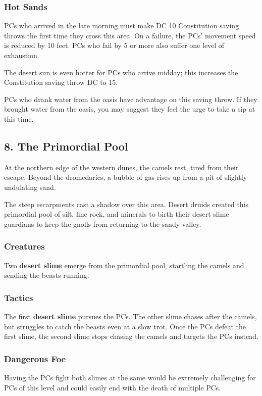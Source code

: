 \documentclass[10pt,a4paper,twoside,bg=print,twocolumn,openany,nodeprecatedcode]{dndbook}
\begin{document}
\subsubsection{Hot Sands}
PCs who arrived in the late morning must make DC 10 Constitution saving throws the first time they cross this area. On a failure, the PCs' movement speed is reduced by 10 feet. PCs who fail by 5 or more also suffer one level of exhaustion.

The desert sun is even hotter for PCs who arrive midday; this increases the Constitution saving throw DC to 15.

PCs who drank water from the oasis have advantage on this saving throw. If they brought water from the oasis, you may suggest they feel the urge to take a sip at this time.

\subsection{8. The Primordial Pool}
\begin{DndReadAloud}{}
At the northern edge of the western dunes, the camels rest, tired from their escape. Beyond the dromedaries, a bubble of gas rises up from a pit of slightly undulating sand.

\end{DndReadAloud}

The steep escarpments cast a shadow over this area. Desert druids created this primordial pool of silt, fine rock, and minerals to birth their desert slime guardians to keep the gnolls from returning to the sandy valley.

\subsubsection{Creatures}
Two \textbf{desert slime} emerge from the primordial pool, startling the camels and sending the beasts running.

\subsubsection{Tactics}
The first \textbf{desert slime} pursues the PCs. The other slime chases after the camels, but struggles to catch the beasts even at a slow trot. Once the PCs defeat the first slime, the second slime stops chasing the camels and targets the PCs instead.

\subsubsection{Dangerous Foe}
Having the PCs fight both slimes at the same would be extremely challenging for PCs of this level and could easily end with the death of multiple PCs.
\end{document}
